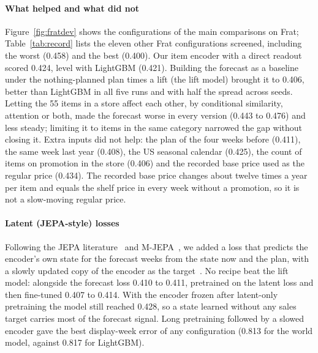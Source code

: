 \paragraph{What helped and what did not}
Figure~\ref{fig:fratdev} shows the configurations of the main comparisons on
Frat; Table~\ref{tab:record} lists the eleven other Frat configurations
screened, including the worst (0.458) and the best (0.400). Our item
encoder with a direct readout scored 0.424, level with LightGBM (0.421).
Building the forecast as a baseline under the nothing-planned plan times a lift
(the lift model) brought it to 0.406, better than LightGBM in all five runs and
with half the spread across seeds. Letting the 55 items in a store affect each
other, by conditional similarity, attention or both, made the forecast worse in
every version (0.443 to 0.476) and less steady; limiting it to items in the same
category narrowed the gap without closing it. Extra inputs did not help: the
plan of the four weeks before (0.411), the same week last year (0.408), the US
seasonal calendar (0.425), the count of items on promotion in the store (0.406)
and the recorded base price used as the regular price (0.434). The recorded
base price changes about twelve times a year per item and equals the shelf
price in every week without a promotion, so it is not a slow-moving regular
price.

\paragraph{Latent (JEPA-style) losses}
Following the JEPA literature~\cite{lecun2022,ijepa} and M-JEPA~\cite{mjepa}, we
added a loss that predicts the encoder's own state for the forecast weeks from
the state now and the plan, with a slowly updated copy of the encoder as the
target~\cite{byol}. No recipe beat the lift model: alongside the forecast loss
0.410 to 0.411, pretrained on the latent loss and then fine-tuned 0.407 to
0.414. With the encoder frozen after latent-only pretraining the model still
reached 0.428, so a state learned without any sales target carries most of the
forecast signal. Long pretraining followed by a slowed encoder gave the best
display-week error of any configuration (0.813 for the world model, against
0.817 for LightGBM).


